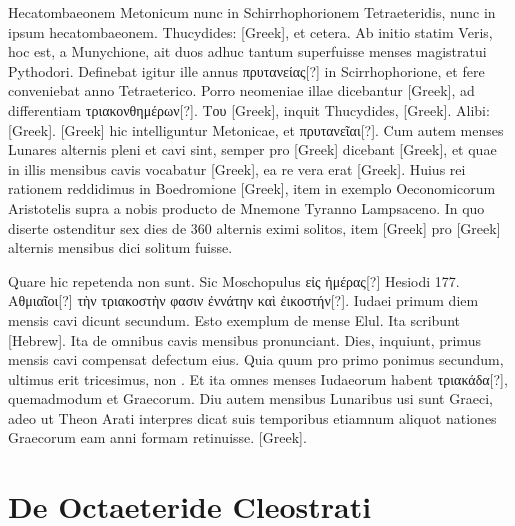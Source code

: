 Hecatombaeonem Metonicum nunc in Schirrhophorionem Tetraeteridis,
nunc in ipsum hecatombaeonem.
Thucydides: \textgreek{[Greek]}, et cetera.
Ab initio statim
Veris, hoc est, a Munychione, ait duos adhuc tantum superfuisse
menses magistratui Pythodori.
Definebat igitur ille annus \textgreek{πρυτανείας[?]}
in Scirrhophorione, et fere conveniebat anno Tetraeterico.
Porro neomeniae
illae dicebantur \textgreek{[Greek]}, ad differentiam
 \textgreek{τριακονθημέρων[?]}.
\textgreek{Του [Greek]}, inquit Thucydides, \textgreek{[Greek]}.
Alibi:
\textgreek{[Greek]}.
\textgreek{[Greek]} hic intelliguntur Metonicae, et
 \textgreek{πρυτανεῖαι[?]}.
Cum autem menses Lunares alternis pleni et cavi sint, semper pro
\textgreek{[Greek]} dicebant \textgreek{[Greek]},
 et quae in illis mensibus cavis
vocabatur \textgreek{[Greek]}, ea re vera erat \textgreek{[Greek]}.
Huius rei rationem
reddidimus in Boedromione \textgreek{[Greek]}, item in exemplo
Oeconomicorum Aristotelis supra a nobis producto de Mnemone
Tyranno Lampsaceno.
In quo diserte ostenditur sex dies de 360 alternis
eximi solitos, item \textgreek{[Greek]} pro
 \textgreek{[Greek]} alternis mensibus
dici solitum fuisse.

Quare hic repetenda non sunt.
Sic Moschopulus
\textgreek{εἰς ἡμέρας[?]} Hesiodi 177.
\textgreek{Αθμιαῖοι[?] τὴν τριακοστὴν φασιν ἐννάτην καὶ ἐικοστήν[?]}.
Iudaei primum diem mensis cavi dicunt secundum.
Esto exemplum
de mense Elul.
Ita scribunt \texthebrew{[Hebrew]}.
Ita de
omnibus cavis mensibus pronunciant.
Dies, inquiunt, primus mensis
cavi compensat defectum eius.
Quia quum pro primo ponimus secundum,
ultimus erit tricesimus, non .
Et ita omnes menses Iudaeorum
habent \textgreek{τριακάδα[?]}, quemadmodum et Graecorum.
Diu autem
mensibus Lunaribus usi sunt Graeci, adeo ut Theon Arati interpres
dicat suis temporibus etiamnum aliquot nationes Graecorum eam anni
formam retinuisse.
\textgreek{[Greek]}.

\section{De Octaeteride Cleostrati}

